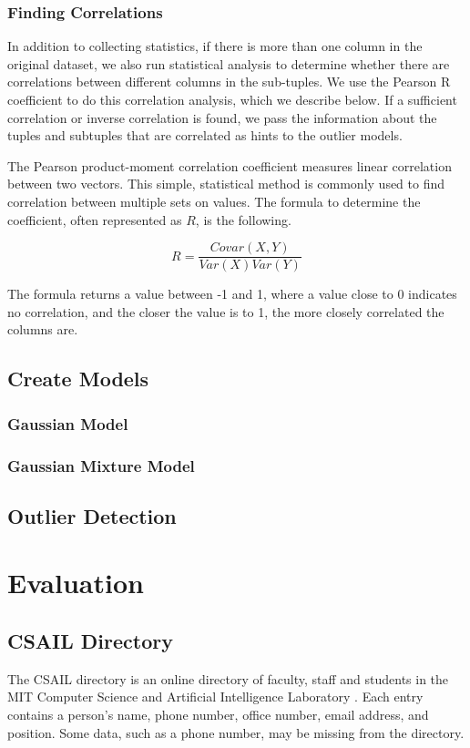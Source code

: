 \documentclass{vldb}
\begin{document}
\subsubsection{Finding Correlations}
In addition to collecting statistics, if there is more than one column in the original dataset, we also run statistical analysis to determine whether there are correlations between different columns in the sub-tuples.
We use the Pearson R coefficient to do this correlation analysis, which we describe below.
If a sufficient correlation or inverse correlation is found, we pass the information about the tuples and subtuples that are correlated as hints to the outlier models.

The Pearson product-moment correlation coefficient measures linear correlation between two vectors.
This simple, statistical method is commonly used to find correlation between multiple sets on values.
The formula to determine the coefficient, often represented as $R$, is the following.

$$
R = \frac{Covar(X,Y)}{Var(X)Var(Y)}
$$

The formula returns a value between -1 and 1, where a value close to 0 indicates no correlation, and the closer the value is to 1, the more closely correlated the columns are.

\subsection{Create Models}
\subsubsection{Gaussian Model}
\subsubsection{Gaussian Mixture Model}
\subsection{Outlier Detection}

\section{Evaluation}
\subsection{CSAIL Directory}
The CSAIL directory is an online directory of faculty, staff and students in the MIT Computer Science and Artificial Intelligence Laboratory \cite{CSAILDirectory}.
Each entry contains a person's name, phone number, office number, email address, and position.
Some data, such as a phone number, may be missing from the directory.
\end{document}
